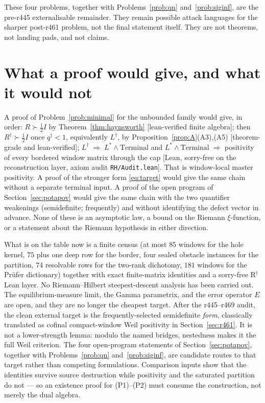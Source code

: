 \documentclass[11pt]{article}
\theoremstyle{remark}
\newcommand{\Rd}{R^{\dagger}}
\newcommand{\Ld}{L^{\dagger}}
\newcommand{\Ls}{L^{*}}
\newcommand{\half}{\tfrac12}
\newcommand{\gr}[1]{\textnormal{\small[#1]}}
\begin{document}
These four problems, together with
Problems~\ref{prob:qn} and~\ref{prob:siginf}, are the
pre-r445 externalisable remainder.  They remain possible attack
languages for the sharper post-r461 problem, not the final
statement itself.  They are not theorems, not landing pads, and
not claims.

\section{What a proof would give, and what it would not}\label{sec:status}

A proof of Problem~\ref{prob:minimal} for the unbounded family
would give, in order:
$R\succ\half I$
by Theorem~\ref{thm:haynsworth} \gr{lean-verified finite algebra};
then $\Rd\succ\half I$ once $q^{\dagger}<1$, equivalently $\Ld$,
by Proposition~\ref{prop:A}(A3),(A5)
\gr{theorem-grade and lean-verified};
$\Ld\;\Rightarrow\;\Ls\wedge\mathrm{Terminal}$
and
$\Ls\wedge\mathrm{Terminal}\;\Rightarrow$
positivity of every bordered window matrix through the cap
\gr{Lean, sorry-free on the reconstruction layer, axiom audit
\texttt{RH/Audit.lean}}.  That is window-local master positivity.
A proof of the stronger form \eqref{eq:target} would give the same
chain without a separate terminal input.  A proof of the open
program of Section~\ref{sec:potapov} would give the same chain
with the two quantifier weakenings (semidefinite; frequently)
and without identifying the defect vector in advance.
None of these is an asymptotic law, a bound on the Riemann
$\xi$-function, or a statement about the Riemann hypothesis in
either direction.

What is on the table now is a finite census (at most $85$ windows
for the hole kernel, $75$ plus one deep row for the border, four
sealed obstacle instances for the partition, $74$ resolvable rows
for the two-rank dichotomy, $181$ windows for the Pr\"ufer
dictionary) together with exact finite-matrix identities and a
sorry-free R$^{\dagger}$ Lean layer.  No Riemann--Hilbert
steepest-descent analysis has been carried out.  The
equilibrium-measure limit, the Gamma parametrix, and the error
operator $E$ are open, and they are no longer the cheapest target.
After the r445--r469 audit, the clean external target is the
frequently-selected semidefinite \emph{form}, classically translated
as cofinal compact-window Weil positivity in
Section~\ref{sec:r461}.  It is not a lower-strength lemma: modulo
the named bridges, nestedness makes it the full Weil criterion.
The four open-program statements of
Section~\ref{sec:potapov}, together with
Problems~\ref{prob:qn} and~\ref{prob:siginf}, are candidate routes
to that target rather than competing formulations.
Comparison inputs show that the identities survive source
destruction while positivity and the saturated partition do not
--- so an existence proof for (P1)--(P2) must consume the
construction, not merely the dual algebra.
\end{document}

